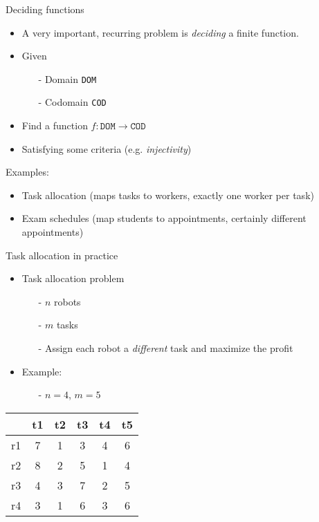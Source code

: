 \begin{frame}{Deciding functions}
\begin{itemize}
\item A very important, recurring problem is \emph{deciding} a finite \alert{function}.
\item Given 
\begin{itemize}
\item[-] Domain \texttt{DOM}
\item[-] Codomain \texttt{COD}
\end{itemize} 
\item Find a function $f : \mathtt{DOM} \to \mathtt{COD}$ 
\item Satisfying some criteria (e.g. \emph{injectivity})
\end{itemize}
\vspace*{1ex}
\pause 
Examples:
\begin{itemize}
\item Task allocation (maps tasks to workers, exactly one worker per task)
\item Exam schedules (map students to appointments, certainly different appointments)
\end{itemize}
\end{frame}

\begin{frame}{Task allocation in practice}
\begin{itemize}
\item Task allocation problem

\begin{itemize}
\item [-] $n$ robots 
\item [-] $m$ tasks
\item [-] Assign each robot a \emph{different} task and maximize the profit
\end{itemize}
\item Example:
\begin{itemize}
\item[-] $n = 4$, $m = 5$
\end{itemize}
\end{itemize}
\centering
\begin{tabular}{|c|c|c|c|c|c|}
\hline 
 & t1 & t2 & t3 & t4 & t5 \\ 
\hline 
r1 & 7 & 1 & 3 & 4 & 6 \\ 
\hline 
r2 & 8 & 2 & 5 & 1 & 4 \\ 
\hline 
r3 & 4 & 3 & 7 & 2 & 5 \\ 
\hline 
r4 & 3 & 1 & 6 & 3 & 6 \\ 
\hline 
\end{tabular} 
\end{frame}


